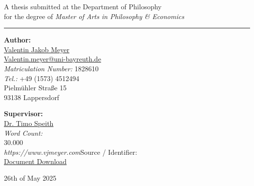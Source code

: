\documentclass[
  11pt,
  letterpaper,
  openany]{book}
\renewcommand*\contentsname{Table of contents}
\newcommand\contentsname{Table of contents}
\begin{document}
\begin{titlepage}
\begin{center}
  A thesis submitted at the Department of Philosophy\\[0.4cm]
  for the degree of \textit{Master of Arts in Philosophy \& Economics}
\end{center}

\vspace{1.5cm}
\hrule
\vspace{1.5cm}

\begin{minipage}[t]{0.48\textwidth}
  \textbf{Author:}\\[0.3cm]
  \href{https://www.vjmeyer.com}{Valentin Jakob Meyer}\\
  \href{mailto:Valentin.meyer@uni-bayreuth.de}{Valentin.meyer@uni-bayreuth.de}\\
  \textit{Matriculation Number:} 1828610\\
  \textit{Tel.:} +49 (1573) 4512494\\
  Pielmühler Straße 15\\
  93138 Lappersdorf
\end{minipage}
\hfill
\begin{minipage}[t]{0.48\textwidth}
  \begin{flushright}
    \textbf{Supervisor:}\\[0.3cm]
    \href{mailto:timo.speith@uni-bayreuth.de}{Dr. Timo Speith}\\[0.35cm]
    \textit{Word Count:}\\
    30.000\\[0.1cm]
    \textit{https://www.vjmeyer.com}{Source / Identifier:}\\
    \href{https://github.com/VJMeyer/submission}{Document Download}
  \end{flushright}
\end{minipage}

\vfill
\begin{center}
  26th of May 2025
\end{center}
\end{titlepage}

\thispagestyle{empty}

\renewcommand*\contentsname{Table of Contents}
{
\setcounter{tocdepth}{9}
\tableofcontents
}
\listoffigures
\listoftables

\mainmatter
{}
\end{document}
